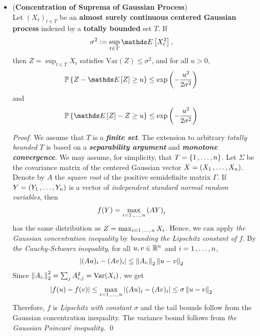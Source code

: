 \documentclass[11pt]{article}
\begin{document}
\begin{itemize}
\item \begin{theorem} (\textbf{Concentration of Suprema of Gaussian Process}) \citep{boucheron2013concentration, vershynin2018high,  wainwright2019high, gine2021mathematical}\\
Let  $(X_t)_{t \in T}$ be an \textbf{almost surely continuous} \textbf{centered Gaussian process} indexed by a \textbf{totally bounded} set $T$. If
\begin{align*}
\sigma^2 &:= \sup_{t \in T}\E{}{X_t^2},
\end{align*} then $Z = \sup_{t \in T}X_t$ satisfies $\text{Var}(Z) \le \sigma^2$, and for all $u > 0$,
\begin{align}
\bP\set{Z - \E{}{Z} \ge u} &\le  \exp\paren{- \frac{u^2}{2 \sigma^2}}  \label{ineqn: gaussian_process_sup_inquality_upper}
\end{align} and
\begin{align}
\bP\set{\E{}{Z} - Z \ge u} &\le  \exp\paren{- \frac{u^2}{2 \sigma^2}}  \label{ineqn: gaussian_process_sup_inquality_upper}
\end{align}
\end{theorem}
\begin{proof}
We assume that $T$ is a \emph{\textbf{finite set}}. The extension to arbitrary \emph{totally bounded} $T$ is based on a \emph{\textbf{separability argument}} and \emph{\textbf{monotone convergence}}. We may assume, for simplicity, that $T = \left\{1 \,{,}\ldots{,}\, n\right\}$. Let $\Sigma$ be the covariance matrix of the centered Gaussian vector $X = (X_1 \,{,}\ldots{,}\, X_n)$. Denote by $A$ the \textit{square root} of the positive semidefinite matrix $\Gamma$. If $Y = (Y_1 \,{,}\ldots{,}\, Y_n)$ is a
vector of \emph{independent standard normal random variables}, then 
\begin{align*}
f(Y) &= \max_{i=1 \,{,}\ldots{,}\, n}\left(A Y\right)_{i}
\end{align*} has the same distribution as $Z = \max_{i=1 \,{,}\ldots{,}\, n}X_i$.  Hence, we can apply \emph{the Gaussian concentration inequality} by \emph{bounding the Lipschitz constant of $f$}. By \emph{the Cauchy-Schwarz inequality}, for all $u, v \in {\mathbb R}^n$ and $i = 1 \,{,}\ldots{,}\, n$,
\begin{align*}
\left\lvert (Au)_i - (Av)_i \right\rvert &\le \left\|A_{i:}\right\|_{2} \left\|u  - v\right\|_{2}
\end{align*} Since $\left\|A_{i:}\right\|_{2}^2 = \sum_{j}A_{i,j}^2 = \text{Var}(X_i)$, we get
\begin{align*}
\left\lvert f(u) - f(v) \right\rvert &\le \max_{i=1 \,{,}\ldots{,}\, n}\left\lvert (Au)_i - (Av)_i \right\rvert \le \sigma \left\|u  - v\right\|_{2}
\end{align*} Therefore, $f$ is \emph{Lipschitz with constant} $\sigma$ and the tail bounds follow from the Gaussian concentration inequality. The variance bound follows from \emph{the Gaussian Poincar{\'e} inequality}. \qed
\end{proof}

\end{itemize}
\end{document}
